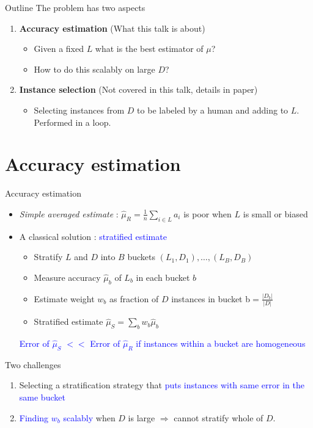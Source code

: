 \documentclass[usenames,dvipsnames, 11pt]{beamer}
\newcommand{\acc}{{a}}
\newcommand{\estSS}{{\mbox{$\hat{\mu}_S$}}}
\newlength{\wideitemsep}
\let\olditem\item
\renewcommand{\item}{\setlength{\itemsep}{\wideitemsep}\olditem}
\begin{document}
\begin{frame}{Outline}
The problem has two aspects \vspace{2mm}
\begin{enumerate}
\item \textbf{Accuracy estimation} (What this talk is about) \vspace{1mm}
\begin{itemize}
\item Given a fixed $L$ what is the best estimator of $\mu$? 
\item How to do this scalably on large $D$?
\end{itemize}
\vspace{3mm}
\item \textbf{Instance selection} (Not covered in this talk, details in paper)
\vspace{1mm}
\begin{itemize}
\item Selecting instances from $D$ to be labeled by a human and adding to $L$. Performed in a loop.
\end{itemize}
\end{enumerate}
\end{frame}

\section{Accuracy estimation}
\begin{frame}{Accuracy estimation}
\begin{itemize}
\pause
\item \emph{Simple averaged estimate} : $\hat{\mu}_R=\frac{1}{n}\sum_{i \in L}\acc_i$ is poor when $L$ is small or biased
\pause
\item A classical solution : \textcolor{blue}{stratified estimate}
  \begin{itemize}
  \item Stratify $L$ and $D$ into $B$ buckets $(L_1,D_1),\ldots,(L_B,D_B)$ 
  \item Measure accuracy $\hat{\mu}_b$ of $L_b$ in each bucket $b$
  \item Estimate weight $w_b$ as fraction of $D$ instances in bucket b$=\frac{|D_b|}{|D|}$
  \item Stratified estimate $\estSS=\sum_b{w_b\hat{\mu}_b}$
  \end{itemize}
  \pause
   \textcolor{blue}{Error of $\estSS $ $<<$  Error of $\hat{\mu}_R$ if instances within a bucket are homogeneous}
\end{itemize}
\pause
Two challenges
\begin{enumerate}
\item Selecting a stratification strategy that \textcolor{blue}{puts instances with same error in the same bucket}
\item \textcolor{blue}{Finding $w_b$ scalably} when $D$ is large $\Rightarrow$ cannot stratify whole of $D$.
\end{enumerate}
\end{frame}
\end{document}
